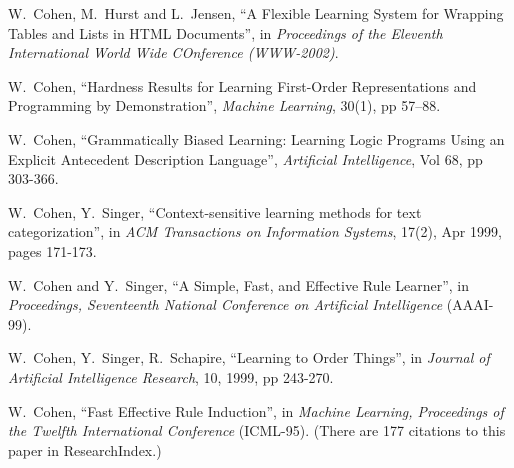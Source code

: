 

\bd
\item[2002] W.~Cohen,  M.~Hurst and L.~Jensen, 
	``A Flexible Learning System for Wrapping Tables and Lists in
	HTML Documents'', in {\em Proceedings of the Eleventh
	International World Wide COnference (WWW-2002)}.

\item[1998] W.~Cohen, ``Hardness Results for Learning 
		First-Order Representations and Programming by 
		Demonstration'', {\it Machine Learning}, 30(1),
	        pp 57--88.

\item[1994] 	W.~Cohen, ``Grammatically Biased Learning:
		Learning Logic Programs Using an Explicit 
		Antecedent Description Language'', 
		{\em Artificial Intelligence}, Vol 68, pp 303-366.
\ed


\bd
\item[1999] W.~Cohen, Y.~Singer,
	``Context-sensitive learning methods for text categorization'',
	in {\it ACM Transactions on Information Systems}, 17(2), Apr 1999,
	pages 171-173.

\item[1999] W.~Cohen and Y.~Singer, ``A Simple, Fast, and Effective
	Rule Learner'', in {\em Proceedings, 
	Seventeenth National Conference on
	Artificial Intelligence} (AAAI-99).

\item[1999] W.~Cohen, Y.~Singer, R.~Schapire,
	``Learning to Order Things'', 	in
	{\it Journal of Artificial Intelligence Research},
	10, 1999, pp 243-270. 

\item[1995] W.~Cohen, ``Fast Effective Rule Induction'', 
		in {\em  Machine Learning, Proceedings
		of the Twelfth International Conference} (ICML-95).
	(There are 177 citations to this paper in ResearchIndex.)
\ed


